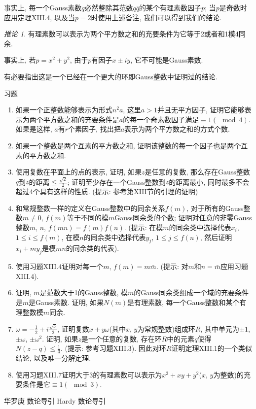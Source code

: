 \documentclass[12pt,a4paper]{book} %
\theoremstyle{remark}
\theoremstyle{example}
\theoremstyle{lemma}
\theoremstyle{corollary}
\newtheorem{corollary}[theorem]{推论}
\numberwithin{theorem}{chapter}
\begin{document}
事实上, 每一个Gauss素数$q$必然整除其范数$q \bar{q}$的某个有理素数因子$p$; 当$p$是奇数时应用定理XIII.4, 以及当$p = 2$时使用上述备注, 我们可以得到我们的结论.

\begin{corollary}
有理素数可以表示为两个平方数之和的充要条件为它等于2或者和1模4同余.
\end{corollary}

事实上, 若$p = x^2 + y^2$, 由于$p$有因子$x \pm iy$, 它不可能是Gauss素数.

有必要指出这是一个已经在一个更大的环即Gauss整数中证明过的结论.

习题

\begin{enumerate}
\item 如果一个正整数能够表示为形式$n^2a$, 这里$a > 1$并且无平方因子, 证明它能够表示为两个平方数之和的充要条件是$a$的每一个奇素数因子满足$\equiv 1 (\mod 4)$. 如果是这样, $a$有$r$个素因子, 找出把$a$表示为两个平方数之和的方式个数.

\item 如果一个整数是两个互素的平方数之和, 证明该整数的每一个因子也是两个互素的平方数之和.

\item 使用复数在平面上的点的表示, 证明, 如果$z$是任意的复数, 那么存在Gauss整数$q$到$z$的距离$\le \frac{\sqrt{2}}{2}$; 证明至少存在一个Gauss整数到$z$的距离最小, 同时最多不会超过4个具有这样的性质. (提示: 参考第XIII节的引理的证明)

\item 和常规整数一样的定义在Gauss整数中的同余关系$f(m)$, 对于所有的Gauss整数$m \neq 0$, $f(m)$等于不同的模$m$Gauss同余类的个数; 证明对任意的非零Gauss整数$m$, $n$, $f(mn) = f(m) f(n)$. (提示: 在模$m$的同余类中选择代表$x_i$, $1 \le i \le f(m)$, 在模$n$的同余类中选择代表$y_j$, $1 \le j \le f(n)$, 然后证明$x_i + my_j$是模$mn$的同余类的代表).

\item 使用习题XIII.4证明对每一个$m$, $f(m) = m\bar{m}$. (提示: 对$m$和$n = \bar{m}$应用习题XIII.4).

\item 证明, $m$是范数大于1的Gauss整数, 模$m$的Gauss同余类组成一个域的充要条件是$m$是Gauss素数. 证明, 如果$N(m)$是有理素数, 每一个Gauss整数和某个有理整数模$m$同余.

\item $\omega = -\frac{1}{2} + i \frac{\sqrt{3}}{2}$, 证明复数$x + y\omega$(其中$x$, $y$为常规整数)组成环$R$, 其中单元为$\pm 1$, $\pm \omega$, $\pm \omega^2$. 证明, 如果$z$是一个任意的复数, 存在环$R$中的元素$q$使得$N(z - q) \le \frac{1}{3}$. (提示: 参考习题XIII.3). 因此对环$R$证明定理XIII.1的一个类似结论, 以及唯一分解定理. \cite{鍵值一}

\item 使用习题XIII.7证明大于3的有理素数可以表示为$x^2 + xy + y^2$($x$, $y$为整数)的充要条件是它$\equiv 1 (\mod 3)$.

\end{enumerate}

\begin{thebibliography}{99}  %
 华罗庚 数论导引
 Hardy 数论导引
\end{thebibliography}

\printindex        %
\end{document}
